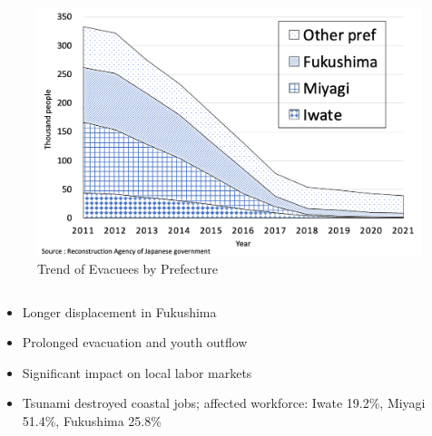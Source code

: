\documentclass[serif, aspectratio=169]{beamer}
\begin{document}
\begin{frame}[label=evacuees_main]
\begin{columns}[T, onlytextwidth]
        \begin{column}{0.485\textwidth}
            \begin{figure}[ht]
                \centering
                \includegraphics[width=\textwidth]{evacuation.png}
                \caption{Trend of Evacuees by Prefecture}
                \label{fig:evacuees_trend}
            \end{figure}
        \end{column}
    \end{columns}
    


\begin{column}{0.49\textwidth}
    \raggedright
    \vspace{-2.5cm}
    \hspace{-1.1cm}
    \small{
        \begin{itemize}

            \item Longer displacement in Fukushima
            \item Prolonged evacuation and youth outflow
            \item Significant impact on local labor markets
            \item Tsunami destroyed coastal jobs; affected workforce: Iwate 19.2\%, Miyagi 51.4\%, Fukushima 25.8\%
        \end{itemize}
    }
\end{column}



\vspace{-0.5cm}

\end{frame}
\end{document}
